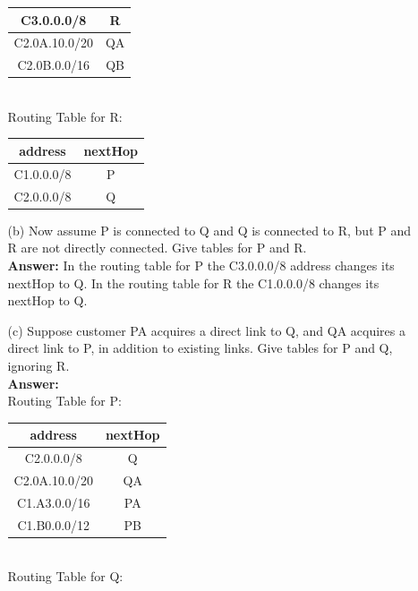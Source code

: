 \documentclass[a4paper]{article}
\begin{document}
\begin{itemize}
\begin{itemize}
\begin{tabular}{|c|c|}
	      	      	\hline	
	      	      	C3.0.0.0/8    & R       \\
	      	      	\hline	
	      	      	C2.0A.10.0/20 & QA      \\
	      	      	\hline	
	      	      	C2.0B.0.0/16  & QB      \\
	      	      	\hline
	      	      \end{tabular} \\
	      	      Routing Table for R: \\
	      	      \begin{tabular}{|c|c|}
	      	      	\hline
	      	      	address    & nextHop \\
	      	      	\hline	
	      	      	C1.0.0.0/8 & P       \\
	      	      	\hline	
	      	      	C2.0.0.0/8 & Q       \\
	      	      	\hline
	      	      \end{tabular}
	      	\item[(b)] Now assume P is connected to Q and Q is connected to R, but P and R are not directly connected. Give tables for P and R. \\
	      	      \textbf{Answer:} In the routing table for P the C3.0.0.0/8 address changes its nextHop to Q. In the routing table for R the C1.0.0.0/8 changes its nextHop to Q.
	      	\item[(c)] Suppose customer PA acquires a direct link to Q, and QA acquires a direct link to P, in addition to existing links. Give tables for P and Q, ignoring R. \\
	      	      \textbf{Answer:} \\
	      	      Routing Table for P: \\
	      	      \begin{tabular}{|c|c|}
	      	      	\hline
	      	      	address       & nextHop \\
	      	      	\hline
	      	      	C2.0.0.0/8    & Q       \\
	      	      	\hline	
	      	      	C2.0A.10.0/20 & QA      \\
	      	      	\hline	
	      	      	C1.A3.0.0/16  & PA      \\
	      	      	\hline	
	      	      	C1.B0.0.0/12  & PB      \\
	      	      	\hline
	      	      \end{tabular} \\
	      	      Routing Table for Q: \\

\end{itemize}
\end{itemize}
\end{document}
